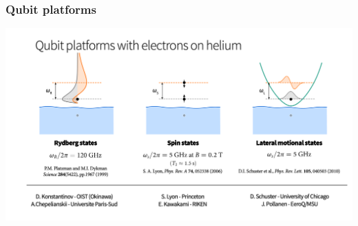 \documentclass{beamer}
\begin{document}
\begin{frame}
\frametitle{Qubit platforms}

\vspace{6mm}

\centerline{\includegraphics[width=1.3\linewidth]{qcfigures/Elhelium2.png}}

\vspace{6mm}
\end{frame}
\end{document}
